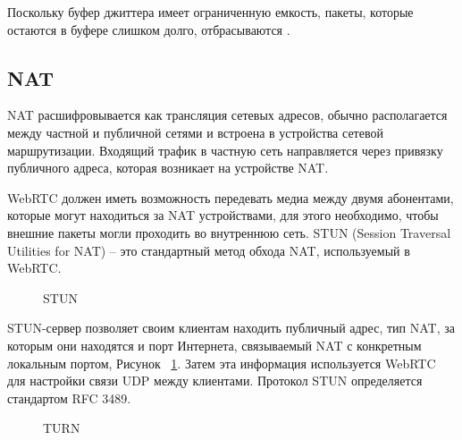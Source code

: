 Поскольку буфер джиттера имеет ограниченную емкость, пакеты, которые остаются в буфере слишком долго, отбрасываются \cite{v13}.

\subsection{NAT}

NAT расшифровывается как трансляция сетевых адресов, обычно располагается между частной и публичной сетями и встроена в устройства сетевой маршрутизации. Входящий трафик в частную сеть направляется через привязку публичного адреса, которая возникает на устройстве NAT.

WebRTC должен иметь возможность передевать медиа между двумя абонентами, которые могут находиться за NAT устройствами, для этого необходимо, чтобы внешние пакеты могли проходить во внутреннюю сеть. STUN (Session Traversal Utilities for NAT) -- это стандартный метод обхода NAT, используемый в WebRTC.

\begin{figure}[ht]
\begin{center}

\caption{
\label{stun}
     STUN}
\end {center}
\end {figure}


STUN-сервер позволяет своим клиентам находить публичный адрес, тип NAT, за которым они находятся и порт Интернета, связываемый NAT с конкретным локальным портом, Рисунок ~\ref{stun}. Затем эта информация используется WebRTC для настройки связи UDP между клиентами. Протокол STUN определяется стандартом RFC 3489.

\begin{figure}[ht]
\begin{center}

\caption{
\label{turn}
     TURN}
\end {center}
\end {figure}

